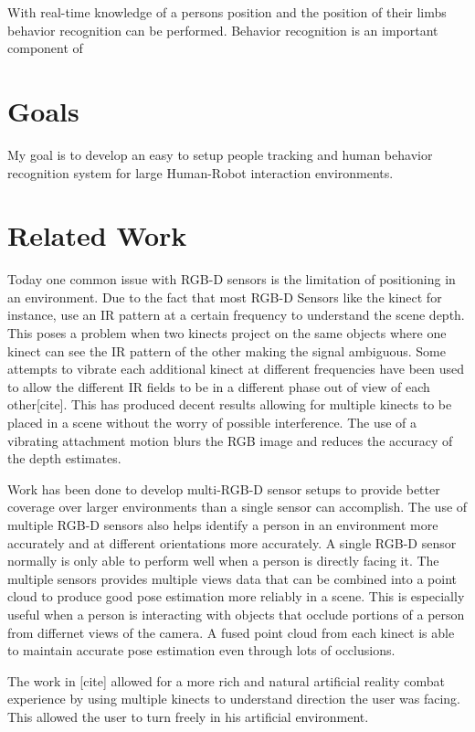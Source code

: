 \documentclass[12pt,a4paper]{article}
\begin{document}
With real-time knowledge of a persons position and the position of their limbs behavior recognition can be performed\cite{journals/ijsr/MeadAM13}. Behavior recognition is an important component of 
\section{Goals}
My goal is to develop an easy to setup people tracking and human behavior recognition system for large Human-Robot interaction environments.
\section{Related Work}
Today one common issue with RGB-D sensors is the limitation of positioning in an environment. Due to the fact that most RGB-D Sensors like the kinect for instance, use an IR pattern at a certain frequency to understand the scene depth. This poses a problem when two kinects project on the same objects where one kinect can see the IR pattern of the other making the signal ambiguous. Some attempts to vibrate each additional kinect at different frequencies have been used to allow the different IR fields to be in a different phase out of view of each other[cite]. This has produced decent results allowing for multiple kinects to be placed in a scene without the worry of possible interference. The use of a vibrating attachment motion blurs the RGB image and reduces the accuracy of the depth estimates.

Work has been done to develop multi-RGB-D sensor setups to provide better coverage over larger environments than a single sensor can accomplish. The use of multiple RGB-D sensors also helps identify a person in an environment more accurately and at different orientations more accurately. A single RGB-D sensor normally is only able to perform well when a person is directly facing it. The multiple sensors provides multiple views data that can be combined into a point cloud to produce good pose estimation more reliably in a scene. This is especially useful when a person is interacting with objects that occlude portions of a person from differnet views of the camera. A fused point cloud from each kinect is able to maintain accurate pose estimation even through lots of occlusions.

The work in [cite] allowed for a more rich and natural artificial reality combat experience by using multiple kinects to understand direction the user was facing. This allowed the user to turn freely in his artificial environment. 
\end{document}
